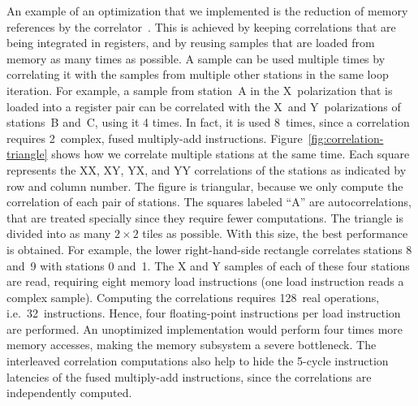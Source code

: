 \documentclass{sig-alternate}
\begin{document}
An example of an optimization that we implemented is the reduction of
memory references by the correlator~\cite{Romein:06}.
This is achieved by keeping correlations that are being integrated
in registers, and by reusing samples that are loaded from memory as many times
as possible.
A sample can be used multiple times by correlating it with the samples from
multiple other stations in the same loop iteration.
For example, a sample from station~A in the X~polarization that is loaded into
a register pair can be correlated with the X~and Y~polarizations of
stations~B and~C, using it 4 times.
In fact, it is used 8~times, since a correlation requires 2~complex, fused
multiply-add instructions.
Figure~\ref{fig:correlation-triangle} shows how we correlate multiple
stations at the same time.
Each square represents the XX, XY, YX, and YY correlations of the stations
as indicated by row and column number.
The figure is triangular, because we only compute the correlation of each
pair of stations.
The squares labeled ``\textsf{A}'' are autocorrelations, that are treated
specially since they require fewer computations.
The triangle is divided into as many $2\times2$ tiles as possible. With this size, 
the best performance is obtained.
For example, the lower right-hand-side rectangle correlates stations 8 and~9
with stations 0 and~1.
The X and Y samples of each of these four stations are read, requiring eight
memory load instructions (one load instruction reads a complex sample).
Computing the correlations requires 128~real operations, i.e.\ 32~instructions.
Hence, four floating-point instructions per load instruction are performed.
An unoptimized implementation would perform four times more memory accesses,
making the memory subsystem a severe bottleneck.
The interleaved correlation computations also help to hide the 5-cycle
instruction latencies of the fused multiply-add instructions, since
the correlations are independently computed.


\end{document}
